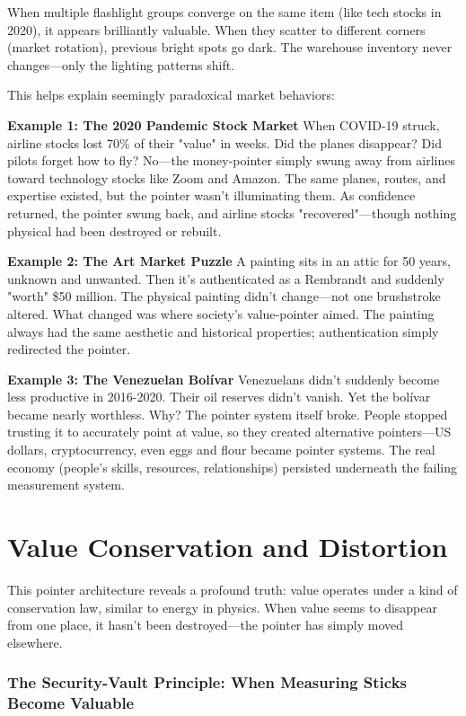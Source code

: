 \documentclass[11pt,oneside]{book}
\begin{document}
When multiple flashlight groups converge on the same item (like tech stocks in 2020), it appears brilliantly valuable. When they scatter to different corners (market rotation), previous bright spots go dark. The warehouse inventory never changes—only the lighting patterns shift.

This helps explain seemingly paradoxical market behaviors:

\textbf{Example 1: The 2020 Pandemic Stock Market}
When COVID-19 struck, airline stocks lost 70\% of their "value" in weeks. Did the planes disappear? Did pilots forget how to fly? No—the money-pointer simply swung away from airlines toward technology stocks like Zoom and Amazon. The same planes, routes, and expertise existed, but the pointer wasn't illuminating them. As confidence returned, the pointer swung back, and airline stocks "recovered"—though nothing physical had been destroyed or rebuilt.

\textbf{Example 2: The Art Market Puzzle}
A painting sits in an attic for 50 years, unknown and unwanted. Then it's authenticated as a Rembrandt and suddenly "worth" \$50 million. The physical painting didn't change—not one brushstroke altered. What changed was where society's value-pointer aimed. The painting always had the same aesthetic and historical properties; authentication simply redirected the pointer.

\textbf{Example 3: The Venezuelan Bolívar}
Venezuelans didn't suddenly become less productive in 2016-2020. Their oil reserves didn't vanish. Yet the bolívar became nearly worthless. Why? The pointer system itself broke. People stopped trusting it to accurately point at value, so they created alternative pointers—US dollars, cryptocurrency, even eggs and flour became pointer systems. The real economy (people's skills, resources, relationships) persisted underneath the failing measurement system.

\section{Value Conservation and Distortion}

This pointer architecture reveals a profound truth: value operates under a kind of conservation law, similar to energy in physics. When value seems to disappear from one place, it hasn't been destroyed—the pointer has simply moved elsewhere.

\subsubsection{The Security-Vault Principle: When Measuring Sticks Become Valuable}
\end{document}
